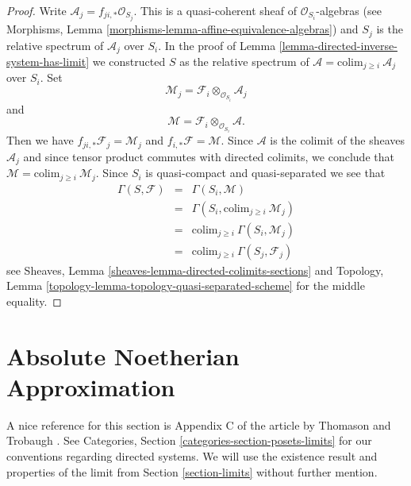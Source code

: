 \begin{proof}
Write $\mathcal{A}_j = f_{ji, *} \mathcal{O}_{S_j}$.
This is a quasi-coherent sheaf of $\mathcal{O}_{S_i}$-algebras
(see Morphisms, Lemma \ref{morphisms-lemma-affine-equivalence-algebras})
and $S_j$ is the relative spectrum of $\mathcal{A}_j$ over $S_i$.
In the proof of Lemma \ref{lemma-directed-inverse-system-has-limit}
we constructed $S$ as the relative spectrum of
$\mathcal{A} = \text{colim}_{j \geq i}\ \mathcal{A}_j$
over $S_i$. Set
$$
\mathcal{M}_j = \mathcal{F}_i \otimes_{\mathcal{O}_{S_i}} \mathcal{A}_j
$$
and
$$
\mathcal{M} = \mathcal{F}_i \otimes_{\mathcal{O}_{S_i}} \mathcal{A}.
$$
Then we have $f_{ji, *} \mathcal{F}_j = \mathcal{M}_j$
and $f_{i, *}\mathcal{F} = \mathcal{M}$. Since $\mathcal{A}$
is the colimit of the sheaves $\mathcal{A}_j$ and since tensor
product commutes with directed colimits, we conclude that
$\mathcal{M} = \text{colim}_{j \geq i}\ \mathcal{M}_j$.
Since $S_i$ is quasi-compact and quasi-separated we see that
\begin{eqnarray*}
\Gamma(S, \mathcal{F})
& = &
\Gamma(S_i, \mathcal{M}) \\
& = &
\Gamma(S_i, \text{colim}_{j \geq i} \ \mathcal{M}_j) \\
& = &
\text{colim}_{j \geq i}\ \Gamma(S_i, \mathcal{M}_j) \\
& = &
\text{colim}_{j \geq i}\ \Gamma(S_j, \mathcal{F}_j)
\end{eqnarray*}
see Sheaves, Lemma \ref{sheaves-lemma-directed-colimits-sections} and
Topology, Lemma \ref{topology-lemma-topology-quasi-separated-scheme}
for the middle equality.
\end{proof}















\section{Absolute Noetherian Approximation}
\label{section-approximation}

\noindent
A nice reference for this section is Appendix C of the article
by Thomason and Trobaugh \cite{TT}.
See Categories, Section \ref{categories-section-posets-limits}
for our conventions regarding directed systems.
We will use the existence result and properties of the limit
from Section \ref{section-limits} without further mention.


